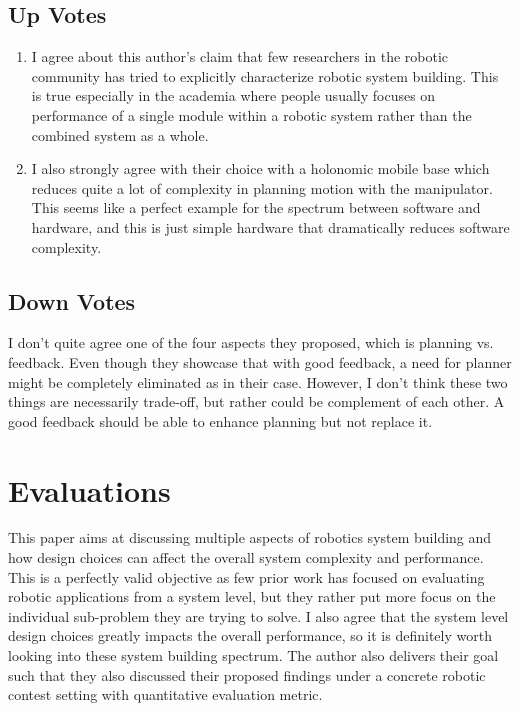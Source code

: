 \documentclass[10pt, twocolumn]{article}
\begin{document}
\subsection{Up Votes}
\begin{enumerate}
  \item I agree about this author's claim that few researchers in the robotic
    community has tried to explicitly characterize robotic system building.
    This is true especially in the academia where people usually focuses on
    performance of a single module within a robotic system rather than
    the combined system as a whole.

  \item I also strongly agree with their choice with a holonomic mobile base
    which reduces quite a lot of complexity in planning motion with the manipulator.
    This seems like a perfect example for the spectrum between software and hardware,
    and this is just simple hardware that dramatically reduces software complexity.
\end{enumerate}

\subsection{Down Votes}
I don't quite agree one of the four aspects they proposed, which is planning vs.
feedback. Even though they showcase that with good feedback, a need for planner
might be completely eliminated as in their case. However, I don't think these
two things are necessarily trade-off, but rather could be complement of each other.
A good feedback should be able to enhance planning but not replace it.

\section{Evaluations}
This paper aims at discussing multiple aspects of robotics system building and
how design choices can affect the overall system complexity and performance. This
is a perfectly valid objective as few prior work has focused on evaluating
robotic applications from a system level, but they rather put more focus on
the individual sub-problem they are trying to solve. I also agree that the
system level design choices greatly impacts the overall performance, so
it is definitely worth looking into these system building spectrum. The author
also delivers their goal such that they also discussed their proposed
findings under a concrete robotic contest setting with quantitative
evaluation metric.
\end{document}

